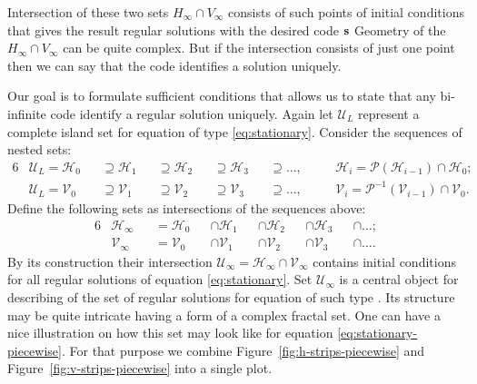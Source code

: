 Intersection of these two sets $H_{\infty} \cap V_{\infty}$ consists of such points of initial conditions that gives the result regular solutions with the desired code $\vb{s}$
Geometry of the $H_{\infty} \cap V_{\infty}$ can be quite complex.
But if the intersection consists of just one point then we can say that the code identifies a solution uniquely.

Our goal is to formulate sufficient conditions that allows us to state that any bi-infinite code identify a regular solution uniquely.
Again let $\mathscr{U}_L$ represent a complete island set for equation of type \eqref{eq:stationary}.
Consider the sequences of nested sets:
\begin{alignat*}{6}
	& \mathscr{U}_L = \mathscr{H}_0 && \supseteq \mathscr{H}_1 && \supseteq \mathscr{H}_2 && \supseteq \mathscr{H}_3 && \supseteq \dots, \quad && \mathscr{H}_i = \mathcal{P}(\mathscr{H}_{i-1}) \cap \mathscr{H}_0; \\
	& \mathscr{U}_L = \mathscr{V}_0 && \supseteq \mathscr{V}_1 && \supseteq \mathscr{V}_2 && \supseteq \mathscr{V}_3 && \supseteq \dots, \quad && \mathscr{V}_i = \mathcal{P}^{-1}(\mathscr{V}_{i-1}) \cap \mathscr{V}_0.
\end{alignat*} 
Define the following sets as intersections of the sequences above:
\begin{alignat*}{6}
	& \mathscr{H}_{\infty} && = \mathscr{H}_0 && \cap \mathscr{H}_1 && \cap \mathscr{H}_2 && \cap \mathscr{H}_3 && \cap \dots; \\
	& \mathscr{V}_{\infty} && = \mathscr{V}_0 && \cap \mathscr{V}_1 && \cap \mathscr{V}_2 && \cap \mathscr{V}_3 && \cap \dots.
\end{alignat*}
By its construction their intersection $\mathscr{U}_{\infty} = \mathscr{H}_{\infty} \cap \mathscr{V}_{\infty}$ contains initial conditions for all regular solutions of equation \eqref{eq:stationary}.
Set $\mathscr{U}_{\infty}$ is a central object for describing of the set of regular solutions for equation of such type \cite{AlfimovAvramenko, AlfimovLebedev, AlfimovKizinZezyulin}.
Its structure may be quite intricate having a form of a complex fractal set.
One can have a nice illustration on how this set may look like for equation \eqref{eq:stationary-piecewise}.
For that purpose we combine Figure~\ref{fig:h-strips-piecewise} and Figure~\ref{fig:v-strips-piecewise} into a single plot.

